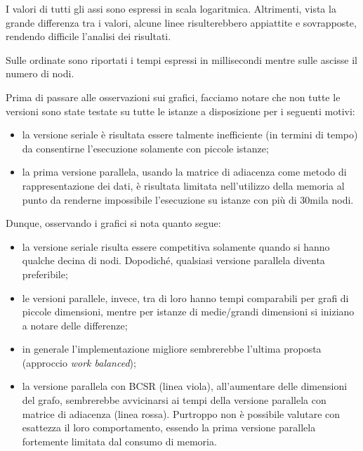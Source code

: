         I valori di tutti gli assi sono espressi in scala logaritmica. Altrimenti, vista la grande differenza tra i valori, alcune linee risulterebbero appiattite e sovrapposte, rendendo difficile l'analisi dei risultati.

        Sulle ordinate sono riportati i tempi espressi in millisecondi mentre sulle ascisse il numero di nodi.

        Prima di passare alle osservazioni sui grafici, facciamo notare che non tutte le versioni sono state testate su tutte le istanze a disposizione per i seguenti motivi:
        \begin{itemize}
            \item la versione seriale è risultata essere talmente inefficiente (in termini di tempo) da consentirne l'esecuzione solamente con piccole istanze;
            \item la prima versione parallela, usando la matrice di adiacenza come metodo di rappresentazione dei dati, è risultata limitata nell'utilizzo della memoria al punto da renderne impossibile l'esecuzione su istanze con più di 30mila nodi.
        \end{itemize}

        Dunque, osservando i grafici si nota quanto segue:
        \begin{itemize}
            \item la versione seriale risulta essere competitiva solamente quando si hanno qualche decina di nodi. Dopodiché, qualsiasi versione parallela diventa preferibile;
            \item le versioni parallele, invece, tra di loro hanno tempi comparabili per grafi di piccole dimensioni, mentre per istanze di medie/grandi dimensioni si iniziano a notare delle differenze;
            \item in generale l'implementazione migliore sembrerebbe l'ultima proposta (approccio \textit{work balanced});
            \item la versione parallela con BCSR (linea viola), all'aumentare delle dimensioni del grafo, sembrerebbe avvicinarsi ai tempi della versione parallela con matrice di adiacenza (linea rossa). Purtroppo non è possibile valutare con esattezza il loro comportamento, essendo la prima versione parallela fortemente limitata dal consumo di memoria.            
        \end{itemize}
        






